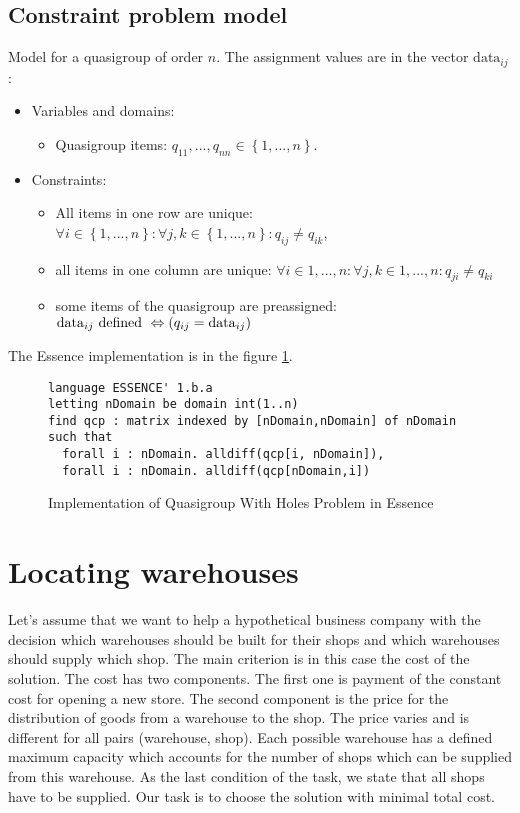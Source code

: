 \subsection{Constraint problem model}
Model for a quasigroup of order $n$. The assignment values are in the vector $\mathrm{data}_{ij}$:

\begin{itemize}
	\item Variables and domains: 
    \begin{itemize}
      \item Quasigroup items: $q_{11}, ..., q_{nn} \in \left\{1, ..., n\right\}$.
    \end{itemize}
	\item Constraints:
	 \begin{itemize}
    	\item All items in one row are unique: $\forall i \in \left\{1, ..., n\right\}: \forall j,k \in \left\{1, ..., n\right\}: q_{ij} \neq q_{ik}$, 
    	\item all items in one column are unique: $\forall i \in {1, ..., n}: \forall j,k \in {1, ..., n}: q_{ji} \neq q_{ki}$ 
    	\item some items of the quasigroup are preassigned: $\mathrm{data}_{ij} \textnormal{ defined } \Leftrightarrow (q_{ij} = \mathrm{data}_{ij})$
	 \end{itemize}
\end{itemize}
The Essence implementation is in the figure \ref{benchmark-essence:qwh}.

\begin{figure}
\caption{\label{benchmark-essence:qwh}Implementation of Quasigroup With Holes Problem in Essence}
\begin{lstlisting}
language ESSENCE' 1.b.a
letting nDomain be domain int(1..n)
find qcp : matrix indexed by [nDomain,nDomain] of nDomain
such that
  forall i : nDomain. alldiff(qcp[i, nDomain]),
  forall i : nDomain. alldiff(qcp[nDomain,i])
\end{lstlisting} 
\end{figure}

\section{Locating warehouses}
Let's assume that we want to help a hypothetical business company with the decision which
warehouses should be built for their shops and which warehouses should supply which
shop. The main criterion is in this case the cost of the solution. The cost has two components. The first one
is payment of the constant cost for opening a new store. The second component is the price for the distribution of
goods from a warehouse to the shop. The price varies and is different for all pairs (warehouse, shop). 
Each possible warehouse has a defined maximum capacity which accounts for the number
of shops which can be supplied from this warehouse. As the last condition of the task, we state that all shops have to be supplied. Our task is to choose the solution with minimal total cost.

